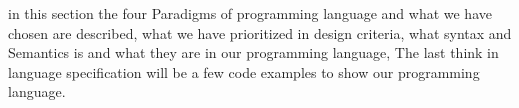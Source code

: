 in this section the four Paradigms of programming language and what we have chosen are described, what we have prioritized in design criteria, what syntax and Semantics is and what they are in our programming language, The last think in language specification will be a few code examples to show our programming language.